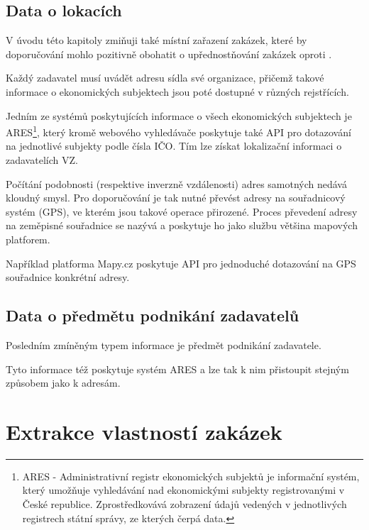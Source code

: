 \documentclass[thesis=M,czech]{FITthesis}[2019/12/23]
\begin{document}
\section{Data o lokacích}
\label{sec:data_locality}

V úvodu této kapitoly zmiňuji také místní zařazení zakázek, které by doporučování mohlo pozitivně obohatit o upřednostňování  zakázek oproti .

Každý zadavatel musí uvádět adresu sídla své organizace, přičemž takové informace o ekonomických subjektech jsou poté dostupné v různých rejstřících.

Jedním ze systémů poskytujících informace o všech ekonomických subjektech je ARES\footnote{ARES - Administrativní registr ekonomických subjektů je informační systém, který umožňuje vyhledávání nad ekonomickými subjekty registrovanými v České republice. Zprostředkovává zobrazení údajů vedených v jednotlivých registrech státní správy, ze kterých čerpá data\cite{ARES}.}, který kromě webového vyhledávače poskytuje také API pro dotazování na jednotlivé subjekty podle čísla IČO. Tím lze získat lokalizační informaci o zadavatelích VZ.

Počítání podobnosti (respektive inverzně vzdálenosti) adres samotných nedává kloudný smysl. Pro doporučování je tak nutné převést adresy na souřadnicový systém (GPS), ve kterém jsou takové operace přirozené.  Proces převedení adresy na zeměpisné souřadnice se nazývá \cite{geocoding} a poskytuje ho jako službu většina mapových platforem.

Například platforma Mapy.cz poskytuje API pro jednoduché dotazování na GPS souřadnice konkrétní adresy.

\section{Data o předmětu podnikání zadavatelů}
\label{sec:data_subsub}

Posledním zmíněným typem informace je předmět podnikání zadavatele.

Tyto informace též poskytuje systém ARES a lze tak k nim přistoupit stejným způsobem jako k adresám.

\chapter{Extrakce vlastností zakázek}
\end{document}

